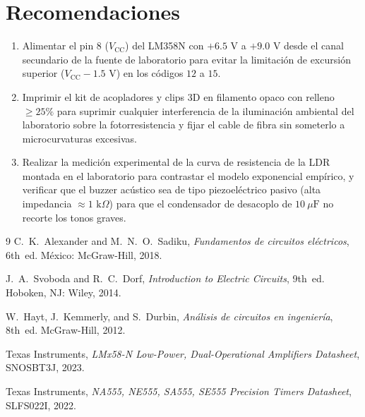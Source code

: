 \documentclass[journal,transmag]{IEEEtran}
\begin{document}
\section{Recomendaciones}
\begin{enumerate}
\item Alimentar el pin 8 ($V_{\text{CC}}$) del LM358N con $+6.5\text{ V}$ a $+9.0\text{ V}$ desde el canal secundario de la fuente de laboratorio para evitar la limitación de excursión superior ($V_{\text{CC}} - 1.5\text{ V}$) en los códigos $12$ a $15$.
\item Imprimir el kit de acopladores y clips 3D en filamento opaco con relleno $\ge 25\%$ para suprimir cualquier interferencia de la iluminación ambiental del laboratorio sobre la fotorresistencia y fijar el cable de fibra sin someterlo a microcurvaturas excesivas.
\item Realizar la medición experimental de la curva de resistencia de la LDR montada en el laboratorio para contrastar el modelo exponencial empírico, y verificar que el buzzer acústico sea de tipo piezoeléctrico pasivo (alta impedancia $\approx 1\text{ k}\Omega$) para que el condensador de desacoplo de $10\ \mu\text{F}$ no recorte los tonos graves.
\end{enumerate}

\begin{thebibliography}{9}
C.~K.~Alexander and M.~N.~O.~Sadiku, \emph{Fundamentos de circuitos eléctricos}, 6th~ed. México: McGraw-Hill, 2018.

J.~A.~Svoboda and R.~C.~Dorf, \emph{Introduction to Electric Circuits}, 9th~ed. Hoboken, NJ: Wiley, 2014.

W.~Hayt, J.~Kemmerly, and S.~Durbin, \emph{Análisis de circuitos en ingeniería}, 8th~ed. McGraw-Hill, 2012.

Texas Instruments, \emph{LMx58-N Low-Power, Dual-Operational Amplifiers Datasheet}, SNOSBT3J, 2023.

Texas Instruments, \emph{NA555, NE555, SA555, SE555 Precision Timers Datasheet}, SLFS022I, 2022.
\end{thebibliography}
\end{document}
